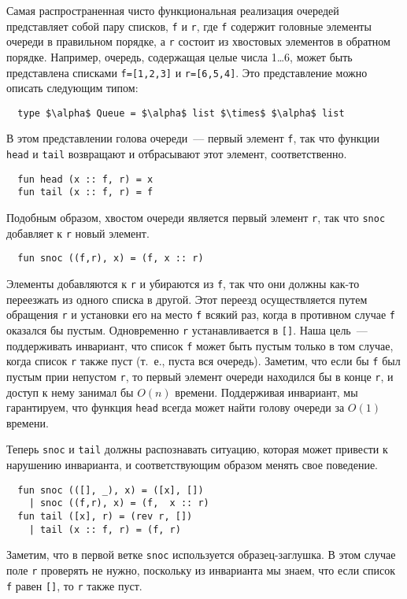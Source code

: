 Самая распространенная чисто функциональная реализация очередей
представляет собой пару списков, \lstinline!f! и \lstinline!r!, где
\lstinline!f! содержит головные элементы очереди в правильном порядке,
а \lstinline!r! состоит из хвостовых элементов в обратном порядке.
Например, очередь, содержащая целые числа 1\ldots 6, может быть
представлена списками \lstinline!f=[1,2,3]! и
\lstinline!r=[6,5,4]!. Это представление можно описать следующим
типом:
\begin{lstlisting}
  type $\alpha$ Queue = $\alpha$ list $\times$ $\alpha$ list
\end{lstlisting}
В этом представлении голова очереди~--- первый элемент \lstinline!f!,
так что функции \lstinline!head! и \lstinline!tail!
возвращают и отбрасывают этот элемент, соответственно.
\begin{lstlisting}
  fun head (x :: f, r) = x
  fun tail (x :: f, r) = f
\end{lstlisting}
Подобным образом, хвостом очереди является первый элемент
\lstinline!r!, так что \lstinline!snoc! добавляет к \lstinline!r!
новый элемент.
\begin{lstlisting}
  fun snoc ((f,r), x) = (f, x :: r)
\end{lstlisting}
Элементы добавляются к \lstinline!r! и убираются из \lstinline!f!, так
что они должны как-то переезжать из одного списка в другой. Этот
переезд осуществляется путем обращения \lstinline!r! и установки его
на место \lstinline!f! всякий раз, когда в противном случае
\lstinline!f! оказался бы пустым. Одновременно \lstinline!r!
устанавливается в \lstinline![]!. Наша цель~--- поддерживать
инвариант, что список \lstinline!f! может быть пустым только в том
случае, когда список \lstinline!r! также пуст (т.~е., пуста вся
очередь). Заметим, что если бы \lstinline!f! был пустым прии непустом
\lstinline!r!, то первый элемент очереди находился бы в конце
\lstinline!r!, и доступ к нему занимал бы $O(n)$ времени. Поддерживая
инвариант, мы гарантируем, что функция \lstinline!head! всегда может
найти голову очереди за $O(1)$ времени.

Теперь \lstinline!snoc! и \lstinline!tail! должны распознавать
ситуацию, которая может привести к нарушению инварианта, и
соответствующим образом менять свое поведение.
\begin{lstlisting}
  fun snoc (([], _), x) = ([x], [])
    | snoc ((f,r), x) = (f,  x :: r)
  fun tail ([x], r) = (rev r, [])
    | tail (x :: f, r) = (f, r)
\end{lstlisting}
Заметим, что в первой ветке \lstinline!snoc! используется
образец-заглушка. В этом случае поле \lstinline!r! проверять не нужно,
поскольку из инварианта мы знаем, что если список \lstinline!f! равен
\lstinline![]!, то \lstinline!r! также пуст.

